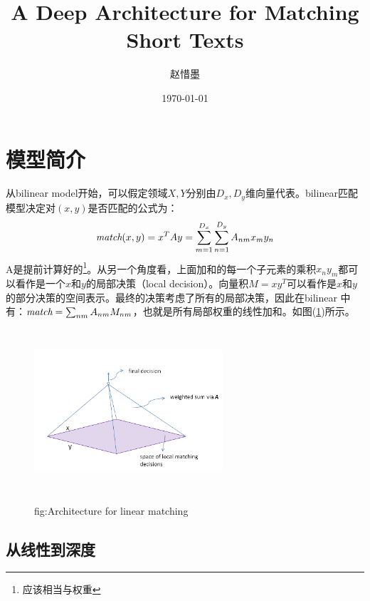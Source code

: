 \documentclass[12pt,a4paper,titlepage]{article}
\begin{document}
\author{赵惜墨}
\title{\bf A Deep Architecture for Matching Short Texts}
\date{\today}
\maketitle
\tableofcontents
\newpage




\renewcommand{\algorithmicrequire}{\textbf{Input:}}
\renewcommand{\algorithmicensure}{\textbf{Output:}}




\section{模型简介}

从bilinear model开始，可以假定领域$X,Y$分别由$D_x,D_y$维向量代表。bilinear匹配模型决定对$(x,y)$是否匹配的公式为：
\begin{displaymath}
  \emph{match}(x,y) = x^{T}Ay = \sum_{m=1}^{D_x} \sum_{n=1}^{D_y} A_{nm}x_my_n
\end{displaymath}
A是提前计算好的\footnote{应该相当与权重}。从另一个角度看，上面加和的每一个子元素的乘积$x_ny_m$都可以看作是一个$x和y的$局部决策（local decision）。向量积$M=xy^{T}$可以看作是$x和y$的部分决策的空间表示。最终的决策考虑了所有的局部决策，因此在bilinear 中有：$\emph{match} = \sum_{nm}A_{nm}M_{nm}$，也就是所有局部权重的线性加和。如图(\ref{fig:bilinear})所示。

\begin{figure}
  \centering
  \includegraphics[height=6cm,width=7cm]{bilinear.png}
  \label{fig:bilinear}
  \caption{fig:Architecture for linear matching}
\end{figure}

\subsection{从线性到深度}
\end{document}
